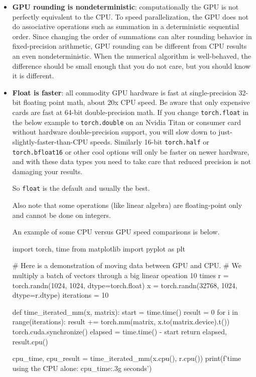 \begin{itemize}
    \item \textbf{GPU rounding is nondeterministic}: computationally the GPU is not perfectly equivalent to the CPU. To speed parallelization, the GPU does not do associative operations such as summation in a deterministic sequential order. Since changing the order of summations can alter rounding behavior in fixed-precision arithmetic, GPU rounding can be different from CPU results an even nondeterministic. When the numerical algorithm is well-behaved, the difference should be small enough that you do not care, but you should know it is different. 
    \item \textbf{Float is faster}: all commodity GPU hardware is fast at single-precision 32-bit floating point math, about 20x CPU speed. Be aware that only expensive cards are fast at 64-bit double-precision math. If you change \texttt{torch.float} in the below example to \texttt{torch.double} on an Nvidia Titan or consumer card without hardware double-precision support, you will slow down to just-slightly-faster-than-CPU speeds. Similarly 16-bit \texttt{torch.half} or \texttt{torch.bfloat16} or other cool options will only be faster on newer hardware, and with these data types you need to take care that reduced precision is not damaging your results. 
    
    So \texttt{float} is the default and usually the best. 

    Also note that some operations (like linear algebra) are floating-point only and cannot be done on integers. 

    An example of some CPU versus GPU speed comparisons is below.

    \begin{exampleblock}
        \begin{codeblock}[language=python]
import torch, time
from matplotlib import pyplot as plt

# Here is a demonstration of moving data between GPU and CPU.
# We multiply a batch of vectors through a big linear opeation 10 times
r = torch.randn(1024, 1024, dtype=torch.float)
x = torch.randn(32768, 1024, dtype=r.dtype)
iterations = 10

def time_iterated_mm(x, matrix):
    start = time.time()
    result = 0
    for i in range(iterations):
        result += torch.mm(matrix, x.to(matrix.device).t())
    torch.cuda.synchronize()
    elapsed = time.time() - start
    return elapsed, result.cpu()

cpu_time, cpu_result = time_iterated_mm(x.cpu(), r.cpu())
print(f'time using the CPU alone: {cpu_time:.3g} seconds')


\end{codeblock}
\end{exampleblock}
\end{itemize}
